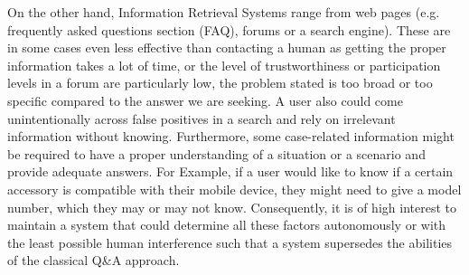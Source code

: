 On the other hand, Information Retrieval Systems range from web pages (e.g. frequently asked questions section (FAQ), forums or a search engine). These are in some cases even less effective than contacting a human as getting the proper information takes a lot of time, or the level of trustworthiness or participation levels in a forum are particularly low, the problem stated is too broad or too specific compared to the answer we are seeking. A user also could come unintentionally across false positives in a search and rely on irrelevant information without knowing.
Furthermore, some case-related information might be required to have a proper understanding of a situation or a scenario and provide adequate answers. For Example, if a user would like to know if a certain accessory is compatible with their mobile device, they might need to give a model number, which they may or may not know.
Consequently, it is of high interest to maintain a system that could determine all these factors autonomously or with the least possible human interference such that a system supersedes the abilities of the classical Q\&A approach.

